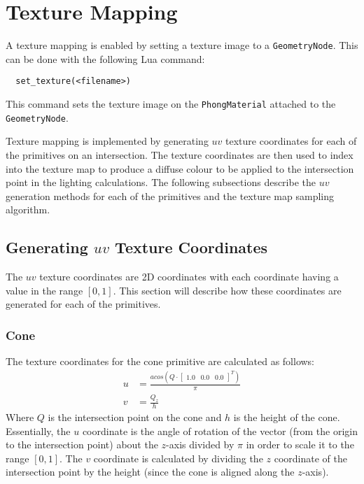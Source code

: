 \section{Texture Mapping}

A texture mapping is enabled by setting a texture image to a
\newline \verb|GeometryNode|. This can be done with the following Lua 
command:
\begin{lstlisting}
  set_texture(<filename>)
\end{lstlisting}
This command sets the texture image on the \verb|PhongMaterial| attached to the
\verb|GeometryNode|. 

Texture mapping is implemented by generating $uv$ texture coordinates for each
of the primitives on an intersection. The texture coordinates are then used to
index into the texture map to produce a diffuse colour to be applied to the
intersection point in the lighting calculations. The following subsections
describe the $uv$ generation methods for each of the primitives and the texture
map sampling algorithm.

\subsection{Generating $uv$ Texture Coordinates}

The $uv$ texture coordinates are 2D coordinates with each coordinate having a
value in the range $[0, 1]$. This section will describe how these coordinates
are generated for each of the primitives.

\subsubsection*{Cone}
The texture coordinates for the cone primitive are calculated as follows:
\begin{equation}
\begin{split}
  u &= \frac{acos(Q \cdot \begin{bmatrix} 1.0 & 0.0 & 0.0 \end{bmatrix}^{T})}
  {\pi} \\
  v &= \frac{Q_{z}}{h}
\end{split}
\end{equation}
Where $Q$ is the intersection point on the cone and $h$ is the height of the
cone. Essentially, the $u$ coordinate is the angle of rotation of the vector 
(from the origin to the intersection point) about the $z$-axis divided by $\pi$ 
in order to scale it to the range $[0, 1]$. The $v$ coordinate is calculated by
dividing the $z$ coordinate of the intersection point by the height (since the
cone is aligned along the $z$-axis).

